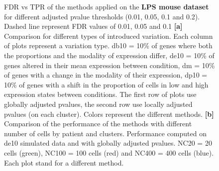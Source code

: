 \documentclass[a4paper, 11pt, twocolumn]{article}
\begin{document}
\begin{figure}[h]
	\caption{{\footnotesize FDR vs TPR of the methods applied on the \textbf{LPS mouse dataset} for different adjusted pvalue thresholds (0.01, 0.05, 0.1 and 0.2). Dashed line represent FDR values of 0.01, 0.05 and 0.1 \textbf{[a]} Comparison for different types of introduced variation. Each column of plots represent a variation type. db10 = 10\% of genes where both the proportions and the modality of expression differ, de10 = 10\% of genes altered in their mean expression between condition, dm = 10\% of genes with a change in the modality of their expression, dp10 = 10\% of genes with a shift in the proportion of cells in low and high expression states between conditions. The first row of plots use globally adjusted pvalues, the second row use locally adjusted pvalues (on each cluster). Colors represent the different methods. \textbf{[b]} Comparison of the performance of the methods with different number of cells by patient and clusters. Performance computed on de10 simulated data and with globally adjusted pvalues. NC20 = 20 cells (green), NC100 = 100 cells (red) and NC400 = 400 cells (blue). Each plot stand for a different method.}}
	\label{fig:fdrtpr_combined_testis}
\end{figure}
\end{document}
